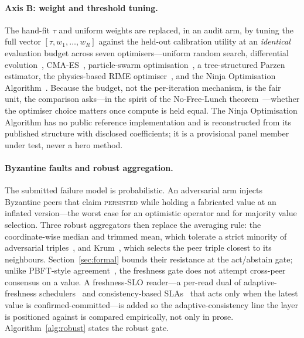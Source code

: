 \documentclass[fleqn,10pt]{wlscirep}
\begin{document}
\paragraph{Axis B: weight and threshold tuning.} The hand-fit $\tau$ and uniform weights are replaced,
in an audit arm, by tuning the full vector $[\tau, w_1,\dots,w_R]$ against the held-out calibration
utility at an \emph{identical} evaluation budget across seven optimisers---uniform random search,
differential evolution~\cite{storn1997de}, CMA-ES~\cite{hansen2001cmaes}, particle-swarm
optimisation~\cite{kennedy1995pso}, a tree-structured Parzen estimator, the physics-based RIME
optimiser~\cite{su2023rime}, and the Ninja Optimisation Algorithm~\cite{elkenawy2024nioa}. Because the
budget, not the per-iteration mechanism, is the fair unit, the comparison asks---in the spirit of the
No-Free-Lunch theorem~\cite{wolpert1997nfl}---whether the optimiser choice matters once compute is
held equal. The Ninja Optimisation Algorithm has no public reference implementation and is
reconstructed from its published structure with disclosed coefficients; it is a provisional panel
member under test, never a hero method.

\paragraph{Byzantine faults and robust aggregation.} The submitted failure model is probabilistic. An
adversarial arm injects Byzantine peers that claim \textsc{persisted} while holding a fabricated value
at an inflated version---the worst case for an optimistic operator and for majority value selection.
Three robust aggregators then replace the averaging rule: the coordinate-wise median and trimmed mean,
which tolerate a strict minority of adversarial triples~\cite{yin2018byzantine}, and
Krum~\cite{blanchard2017krum}, which selects the peer triple closest to its neighbours.
Section~\ref{sec:formal} bounds their resistance at the act/abstain gate; unlike PBFT-style
agreement~\cite{castro2002pbft}, the freshness gate does not attempt cross-peer consensus on a value.
A freshness-SLO reader---a per-read dual of adaptive-freshness schedulers~\cite{wooders2024ralf} and
consistency-based SLAs~\cite{terry2013pileus,bailis2012pbs} that acts only when the latest value is
confirmed-committed---is added so the adaptive-consistency line the layer is positioned against is
compared empirically, not only in prose. Algorithm~\ref{alg:robust} states the robust gate.
\end{document}
